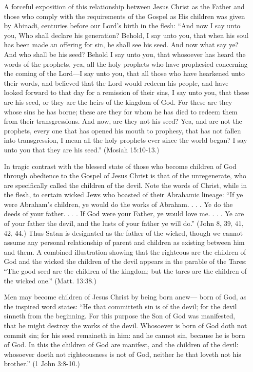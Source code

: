 A forceful exposition of this relationship between Jesus Christ as the Father and those who
comply with the requirements of the Gospel as His children was given by Abinadi, centuries
before our Lord's birth in the flesh: ``And now I say unto you, Who shall declare his
generation? Behold, I say unto you, that when his soul has been made an offering for sin, he
shall see his seed. And now what say ye? And who shall be his seed? Behold I say unto you,
that whosoever has heard the words of the prophets, yea, all the holy prophets who have
prophesied concerning the coming of the Lord—I say unto you, that all those who have
hearkened unto their words, and believed that the Lord would redeem his people, and have
looked forward to that day for a remission of their sins, I say unto you, that these are his seed,
or they are the heirs of the kingdom of God. For these are they whose sins he has borne; these
are they for whom he has died to redeem them from their transgressions. And now, are they
not his seed? Yea, and are not the prophets, every one that has opened his mouth to prophesy,
that has not fallen into transgression, I mean all the holy prophets ever since the world
began? I say unto you that they are his seed.'' (Mosiah 15:10-13.)

In tragic contrast with the blessed state of those who become children of God through
obedience to the Gospel of Jesus Christ is that of the unregenerate, who are specifically
called the children of the devil. Note the words of Christ, while in the flesh, to certain wicked
Jews who boasted of their Abrahamic lineage: ``If ye were Abraham's children, ye would do
the works of Abraham. . . . Ye do the deeds of your father. . . . If God were your Father, ye
would love me. . . . Ye are of your father the devil, and the lusts of your father ye will do.''
(John 8, 39, 41, 42, 44.) Thus Satan is designated as the father of the wicked, though we
cannot assume any personal relationship of parent and children as existing between him and
them. A combined illustration showing that the righteous are the children of God and the
wicked the children of the devil appears in the parable of the Tares: ``The good seed are the
children of the kingdom; but the tares are the children of the wicked one.'' (Matt. 13:38.)

Men may become children of Jesus Christ by being born anew— born of God, as the inspired
word states: ``He that committeth sin is of the devil; for the devil sinneth from the beginning.
For this purpose the Son of God was manifested, that he might destroy the works of the devil.
Whosoever is born of God doth not commit sin; for his seed remaineth in him: and he cannot
sin, because he is born of God. In this the children of God are manifest, and the children of
the devil: whosoever doeth not righteousness is not of God, neither he that loveth not his
brother.'' (1 John 3:8-10.)


